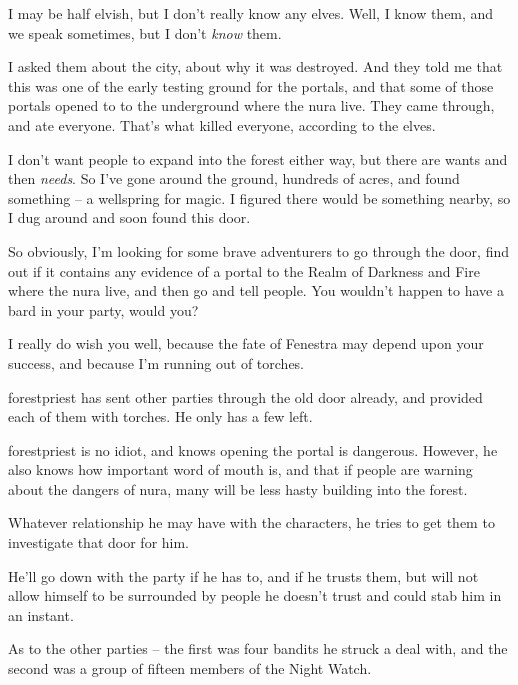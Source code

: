 \begin{multicols}{2}
\begin{speechtext}
	I may be half elvish, but I don't really know any elves.  Well, I know them, and we speak sometimes, but I don't \emph{know} them.

	I asked them about the city, about why it was destroyed.
	And they told me that this was one of the early testing ground for the portals, and that some of those portals opened to to the underground where the nura live.
	They came through, and ate everyone.
	That's what killed everyone, according to the elves.

	I don't want people to expand into the forest either way, but there are wants and then \emph{needs}.  So I've gone around the ground, hundreds of acres, and found something -- a wellspring for magic.  I figured there would be something nearby, so I dug around and soon found this door.

	So obviously, I'm looking for some brave adventurers to go through the door, find out if it contains any evidence of a portal to the Realm of Darkness and Fire where the nura live, and then go and tell people.
	You wouldn't happen to have a bard in your party, would you?

	I really do wish you well, because the fate of Fenestra may depend upon your success, and because I'm running out of torches.

\end{speechtext}

\Gls{forestpriest} has sent other parties through the old door already, and provided each of them with torches.
He only has a few left.

\Gls{forestpriest} is no idiot, and knows opening the portal is dangerous.
However, he also knows how important word of mouth is, and that if people are warning about the dangers of nura, many will be less hasty building into the forest.

Whatever relationship he may have with the characters, he tries to get them to investigate that door for him.

He'll go down with the party if he has to, and if he trusts them, but will not allow himself to be surrounded by people he doesn't trust and could stab him in an instant.

As to the other parties -- the first was four bandits he struck a deal with, and the second was a group of fifteen members of the Night Watch.




\end{multicols}
